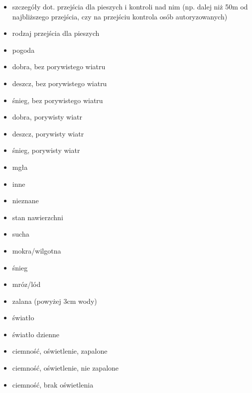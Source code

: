 \begin{itemize}
\item
  szczegóły dot. przejścia dla pieszych i kontroli nad nim (np. dalej
  niż 50m od najbliższego przejścia, czy na przejściu kontrola osób
  autoryzowanych)\\
\item
  rodzaj przejścia dla pieszych\\
\item
  pogoda\\
\item
  dobra, bez porywistego wiatru\\
\item
  deszcz, bez porywistego wiatru\\
\item
  śnieg, bez porywistego wiatru\\
\item
  dobra, porywisty wiatr\\
\item
  deszcz, porywisty wiatr\\
\item
  śnieg, porywisty wiatr\\
\item
  mgła\\
\item
  inne\\
\item
  nieznane\\
\item
  stan nawierzchni\\
\item
  sucha\\
\item
  mokra/wilgotna\\
\item
  śnieg\\
\item
  mróz/lód\\
\item
  zalana (powyżej 3cm wody)\\
\item
  światło\\
\item
  światło dzienne\\
\item
  ciemność, oświetlenie, zapalone\\
\item
  ciemność, oświetlenie, nie zapalone\\
\item
  ciemność, brak oświetlenia\\

\end{itemize}
